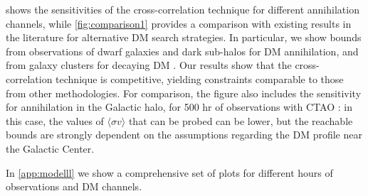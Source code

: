  shows the sensitivities of the cross-correlation technique for different annihilation channels, while \cref{fig:comparison1} provides a comparison with existing results in the literature for alternative DM search strategies. In particular, we show bounds from observations of dwarf galaxies \cite{CTA_2017} and dark sub-halos \cite{Coronado_Blazquez_2021} for DM annihilation, and from galaxy clusters for decaying DM \cite{CTA2023,MAGIC_2018,Huang_2012,Cirelli_2012}. Our results show that the cross-correlation technique is competitive, yielding constraints comparable to those from other methodologies. For comparison, the figure also includes the sensitivity for annihilation in the Galactic halo, for 500 hr of observations with CTAO \cite{CTA_2017}: in this case, the values of $\langle \sigma v \rangle$ that can be probed can be lower, but the reachable bounds are strongly dependent on the assumptions regarding the DM profile near the Galactic Center.

In {\cref{app:modelll}} we show a comprehensive set of plots for different hours of observations and DM channels. 




